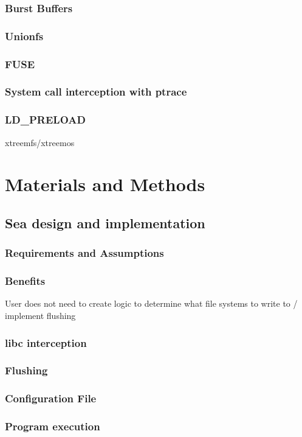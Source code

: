 \documentclass[10pt,journal,compsoc]{IEEEtran}
\begin{document}
\subsubsection{Burst Buffers}
\subsubsection{Unionfs}
\subsubsection{FUSE}
\subsubsection{System call interception with ptrace}
\subsubsection{LD\_PRELOAD}
xtreemfs/xtreemos

\section{Materials and Methods}

\subsection{Sea design and implementation}
\subsubsection{Requirements and Assumptions}
\subsubsection{Benefits}
User does not need to create logic to determine what file systems to write to / implement flushing

\subsubsection{libc interception}
\subsubsection{Flushing}
\subsubsection{Configuration File}
\subsubsection{Program execution}
\end{document}
